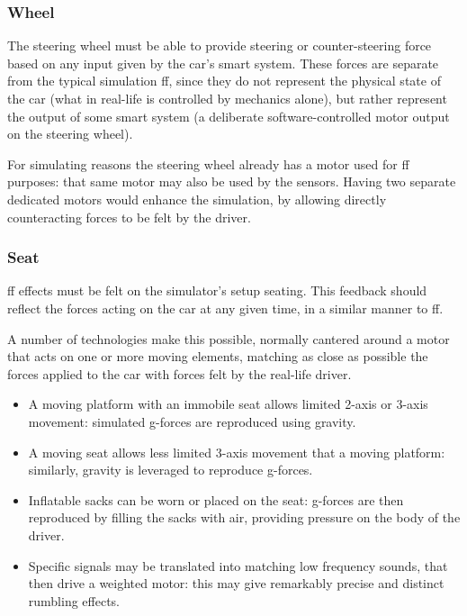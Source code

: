 \subsubsection{Wheel}

The steering wheel must be able to provide steering or counter-steering force based on any input given by the car's smart system. These forces are separate from the typical simulation \gls{ff}, since they do not represent the physical state of the car (what in real-life is controlled by mechanics alone), but rather represent the output of some smart system (a deliberate software-controlled motor output on the steering wheel).

For simulating reasons the steering wheel already has a motor used for \gls{ff} purposes: that same motor may also be used by the sensors. Having two separate dedicated motors would enhance the simulation, by allowing directly counteracting forces to be felt by the driver.

\subsubsection{Seat}

\gls{ff} effects must be felt on the simulator's setup seating. This feedback should reflect the forces acting on the car at any given time, in a similar manner to \gls{ff}.

A number of technologies make this possible, normally cantered around a motor that acts on one or more moving elements, matching as close as possible the forces applied to the car with forces felt by the real-life driver.

\begin{itemize}
	\item A moving platform with an immobile seat allows limited 2-axis or 3-axis movement: simulated g-forces are reproduced using gravity.
    \item A moving seat allows less limited 3-axis movement that a moving platform: similarly, gravity is leveraged to reproduce g-forces.
	\item Inflatable sacks can be worn or placed on the seat: g-forces are then reproduced by filling the sacks with air, providing pressure on the body of the driver.~\cite{feasibility:gametrix}
	\item Specific signals may be translated into matching low frequency sounds, that then drive a weighted motor: this may give remarkably precise and distinct rumbling effects.~\cite{feasibility:buttkicker}
\end{itemize}

